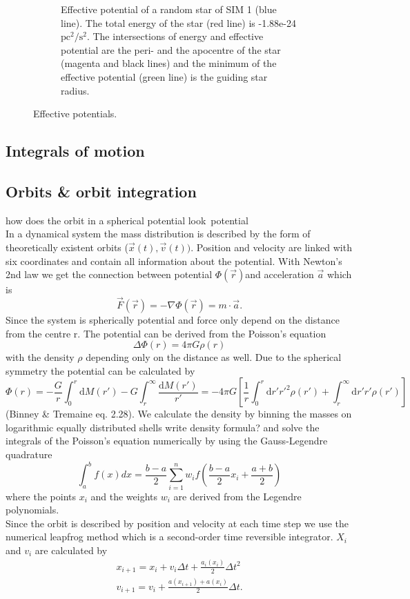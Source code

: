 \begin{figure}[htbp]
\begin{subfigure}{0.475\textwidth}
	\caption{Effective potential of a random star of SIM 1 (blue line). The total energy of the star (red line) is -1.88e-24 \(\mathrm{pc}^2/\mathrm{s}^2\). The intersections of energy and effective potential are the peri- and the apocentre of the star (magenta and black lines) and the minimum of the effective potential (green line) is the guiding star radius.}
	\label{pot_eff_theory_part}
	\end{subfigure}
\caption{Effective potentials.}
\label{fig:pot_eff_theory}
\end{figure}
\subsection{Integrals of motion}\label{int_of_motion_theory}
\subsection{Orbits \& orbit integration}\label{orbit_theory}
\color{red} how does the orbit in a spherical potential look\ potential\\ \color{black}
In a dynamical system the mass distribution is described by the form of theoretically existent orbits (\(\vec{x}(t),\vec{v}(t))\). Position and velocity are linked with six coordinates and contain all information about the potential. With Newton's 2nd law we get the connection between potential \(\Phi(\vec{r})\)and acceleration \(\vec{a}\) which is \[\vec{F}(\vec{r})=-\nabla\Phi(\vec{r})=m\cdot\vec{a}.\] Since the system is spherically potential and force only depend on the distance from the centre r. The potential can be derived from the Poisson's equation \begin{equation}
\Delta\Phi(r)=4\pi G \rho(r)
\end{equation}
with the density \(\rho\) depending only on the distance as well. Due to the spherical symmetry the potential can be calculated by 
\begin{equation}
\Phi(r)=-\frac{G}{r}\int_0^r{\mathrm{d}M(r')}-G\int_r^{\infty}{\frac{\mathrm{d}M(r')}{r'}}=-4\pi G\left[\frac{1}{r}\int_0^r\mathrm{d}r'r'^2\rho(r')+\int_r^{\infty}\mathrm{d}r'r'\rho(r')\right]
\end{equation} (Binney \& Tremaine eq. 2.28). We calculate the density by binning the masses on logarithmic equally distributed shells \color{red} write density formula? \color{black} and solve the integrals of the Poisson's equation numerically by using the Gauss-Legendre quadrature \[\int_a^b f(x)dx = \frac{b-a}{2}\sum_{i=1}^n w_i f\left(\frac{b-a}{2}x_i+\frac{a+b}{2}\right)\] where the points \(x_i\) and the weights \(w_i\) are derived from the Legendre polynomials.\\ Since the orbit is described by position and velocity at each time step we use the numerical leapfrog method which is a second-order time reversible integrator. \(X_i\) and \(v_i\) are calculated by 
\begin{align*}
x_{i+1}=x_i+v_i\Delta t+\frac{a_i(x_i)}{2}\Delta t^2 \\
v_{i+1}=v_i+\frac{a(x_{i+1})+a(x_i)}{2}\Delta t.
\end{align*}

